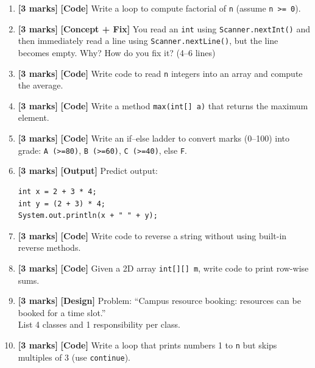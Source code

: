 \documentclass[11pt,a4paper]{article}
\newcommand{\MMarks}{\textbf{[3 marks]} }
\begin{document}
\begin{enumerate}[label=\textbf{M\arabic*.}, leftmargin=*]
  \item \MMarks \textbf{[Code]} Write a loop to compute factorial of \texttt{n} (assume \texttt{n >= 0}).

  \item \MMarks \textbf{[Concept + Fix]} You read an \texttt{int} using \texttt{Scanner.nextInt()} and then immediately read a line using
    \texttt{Scanner.nextLine()}, but the line becomes empty. Why? How do you fix it? (4--6 lines)

  \item \MMarks \textbf{[Code]} Write code to read \texttt{n} integers into an array and compute the average.

  \item \MMarks \textbf{[Code]} Write a method \texttt{max(int[] a)} that returns the maximum element.

  \item \MMarks \textbf{[Code]} Write an if--else ladder to convert marks (0--100) into grade:
    \texttt{A (>=80)}, \texttt{B (>=60)}, \texttt{C (>=40)}, else \texttt{F}.

  \item \MMarks \textbf{[Output]} Predict output:
    \begin{lstlisting}
int x = 2 + 3 * 4;
int y = (2 + 3) * 4;
System.out.println(x + " " + y);
    \end{lstlisting}

  \item \MMarks \textbf{[Code]} Write code to reverse a string without using built-in reverse methods.

  \item \MMarks \textbf{[Code]} Given a 2D array \texttt{int[][] m}, write code to print row-wise sums.

  \item \MMarks \textbf{[Design]} Problem: ``Campus resource booking: resources can be booked for a time slot.''\\
    List 4 classes and 1 responsibility per class.

  \item \MMarks \textbf{[Code]} Write a loop that prints numbers 1 to \texttt{n} but skips multiples of 3 (use \texttt{continue}).
\end{enumerate}
\end{document}
